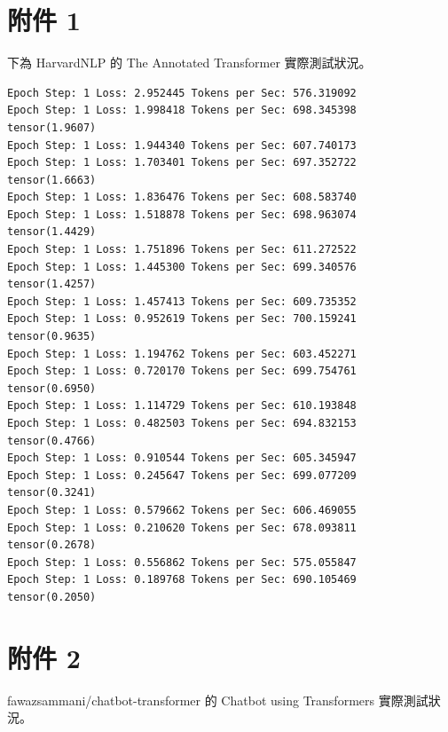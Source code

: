 \documentclass[10pt,UTF8]{ctexart}
\begin{document}

\section{附件 1}

下為 HarvardNLP 的 The Annotated Transformer 實際測試狀況。

\begin{verbatim}
Epoch Step: 1 Loss: 2.952445 Tokens per Sec: 576.319092
Epoch Step: 1 Loss: 1.998418 Tokens per Sec: 698.345398
tensor(1.9607)
Epoch Step: 1 Loss: 1.944340 Tokens per Sec: 607.740173
Epoch Step: 1 Loss: 1.703401 Tokens per Sec: 697.352722
tensor(1.6663)
Epoch Step: 1 Loss: 1.836476 Tokens per Sec: 608.583740
Epoch Step: 1 Loss: 1.518878 Tokens per Sec: 698.963074
tensor(1.4429)
Epoch Step: 1 Loss: 1.751896 Tokens per Sec: 611.272522
Epoch Step: 1 Loss: 1.445300 Tokens per Sec: 699.340576
tensor(1.4257)
Epoch Step: 1 Loss: 1.457413 Tokens per Sec: 609.735352
Epoch Step: 1 Loss: 0.952619 Tokens per Sec: 700.159241
tensor(0.9635)
Epoch Step: 1 Loss: 1.194762 Tokens per Sec: 603.452271
Epoch Step: 1 Loss: 0.720170 Tokens per Sec: 699.754761
tensor(0.6950)
Epoch Step: 1 Loss: 1.114729 Tokens per Sec: 610.193848
Epoch Step: 1 Loss: 0.482503 Tokens per Sec: 694.832153
tensor(0.4766)
Epoch Step: 1 Loss: 0.910544 Tokens per Sec: 605.345947
Epoch Step: 1 Loss: 0.245647 Tokens per Sec: 699.077209
tensor(0.3241)
Epoch Step: 1 Loss: 0.579662 Tokens per Sec: 606.469055
Epoch Step: 1 Loss: 0.210620 Tokens per Sec: 678.093811
tensor(0.2678)
Epoch Step: 1 Loss: 0.556862 Tokens per Sec: 575.055847
Epoch Step: 1 Loss: 0.189768 Tokens per Sec: 690.105469
tensor(0.2050)
\end{verbatim}

\newpage

\section{附件 2}

fawazsammani/chatbot-transformer 的  Chatbot using Transformers 實際測試狀況。

\end{document}

